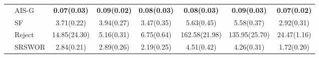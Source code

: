 \begin{tabular}{llcccccc}
                         & AIS-G                 & \textbf{0.07(0.03)}   & \textbf{0.09(0.02)}   & \textbf{0.08(0.03)}   & \textbf{0.08(0.03)}   & \textbf{0.09(0.03)}   & \textbf{0.07(0.02)}   \\
                         & SF                    & {3.71(0.22)}          & {3.94(0.27)}          & {3.47(0.35)}          & {5.63(0.45)}          & {5.58(0.37)}          & {2.92(0.31)}          \\
                         & Reject                & {14.85(24.30)}        & {5.16(0.31)}          & {6.75(0.64)}          & {162.58(21.98)}       & {135.95(25.70)}       & {24.47(1.16)}         \\
                         & SRSWOR                & {2.84(0.21)}          & {2.89(0.26)}          & {2.19(0.25)}          & {4.51(0.42)}          & {4.26(0.31)}          & {1.72(0.20)}          \\
  \bottomrule
\end{tabular}
